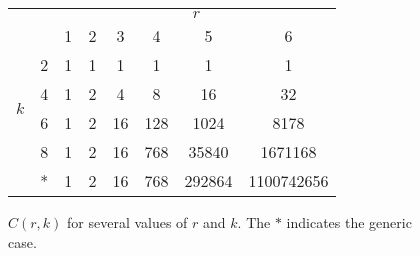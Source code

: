 \documentclass[11pt,reqno]{amsart}
\theoremstyle{definition}
\theoremstyle{problem}
\theoremstyle{plain}
\theoremstyle{remark}
\theoremstyle{theorem}
\numberwithin{equation}{section}
\numberwithin{figure}{section}
\theoremstyle{definition}
\theoremstyle{problem}
\theoremstyle{plain}
\begin{document}
\begin{figure}[H]
    \centering
    \begin{tabular}{c c|c c c c c c|}
    \cline{3-8}
    & & \multicolumn{6}{c|}{$r$}\\ \cline{3-8}
    & & 1 & 2 & 3 & 4 & 5 & 6 \\\cline{1-8}
    \multicolumn{1}{|c|}{\multirow{4}{*}{$k$}} & 2 & 1 & 1 & 1 & 1 & 1 & 1\\
    \multicolumn{1}{|c|}{} & 4 & 1 & 2 & 4 & 8 & 16 & 32\\
    \multicolumn{1}{|c|}{} & 6 & 1 & 2 & 16 & 128 & 1024 & 8178\\
    \multicolumn{1}{|c|}{} & 8 & 1 & 2 & 16 & 768 & 35840 & 1671168\\
    \multicolumn{1}{|c|}{} & * & 1 & 2 & 16 & 768 & 292864 & 1100742656\\\hline
    \end{tabular}
    \caption{$C(r,k)$ for several values of $r$ and $k$.  The $*$
      indicates the generic case.}
    \label{figure:keven}
\end{figure}
\end{document}
